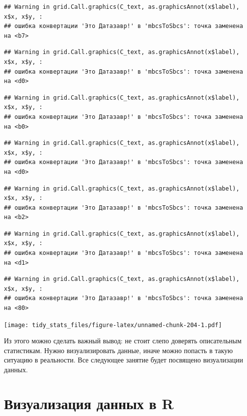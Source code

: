 \documentclass[]{book}
\begin{document}
\begin{verbatim}
## Warning in grid.Call.graphics(C_text, as.graphicsAnnot(x$label), x$x, x$y, :
## ошибка конвертации 'Это Датазавр!' в 'mbcsToSbcs': точка заменена на <b7>
\end{verbatim}

\begin{verbatim}
## Warning in grid.Call.graphics(C_text, as.graphicsAnnot(x$label), x$x, x$y, :
## ошибка конвертации 'Это Датазавр!' в 'mbcsToSbcs': точка заменена на <d0>
\end{verbatim}

\begin{verbatim}
## Warning in grid.Call.graphics(C_text, as.graphicsAnnot(x$label), x$x, x$y, :
## ошибка конвертации 'Это Датазавр!' в 'mbcsToSbcs': точка заменена на <b0>
\end{verbatim}

\begin{verbatim}
## Warning in grid.Call.graphics(C_text, as.graphicsAnnot(x$label), x$x, x$y, :
## ошибка конвертации 'Это Датазавр!' в 'mbcsToSbcs': точка заменена на <d0>
\end{verbatim}

\begin{verbatim}
## Warning in grid.Call.graphics(C_text, as.graphicsAnnot(x$label), x$x, x$y, :
## ошибка конвертации 'Это Датазавр!' в 'mbcsToSbcs': точка заменена на <b2>
\end{verbatim}

\begin{verbatim}
## Warning in grid.Call.graphics(C_text, as.graphicsAnnot(x$label), x$x, x$y, :
## ошибка конвертации 'Это Датазавр!' в 'mbcsToSbcs': точка заменена на <d1>
\end{verbatim}

\begin{verbatim}
## Warning in grid.Call.graphics(C_text, as.graphicsAnnot(x$label), x$x, x$y, :
## ошибка конвертации 'Это Датазавр!' в 'mbcsToSbcs': точка заменена на <80>
\end{verbatim}

\texttt{[image: tidy\_stats\_files/figure-latex/unnamed-chunk-204-1.pdf]}

Из этого можно сделать важный вывод: не стоит слепо доверять
описательным статистикам. Нужно визуализировать данные, иначе можно
попасть в такую ситуацию в реальности. Все следующее занятие будет
посвящено визуализации данных.

\section{Визуализация данных в R}\label{vis_r}
\end{document}
